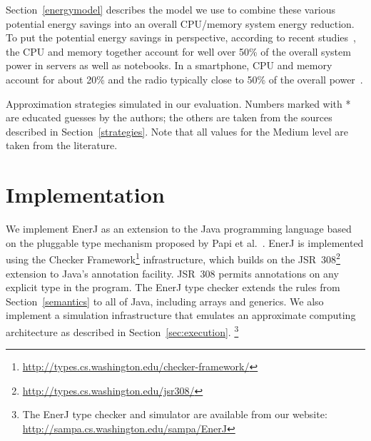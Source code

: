 \medskip
\noindent
Section~\ref{energymodel} describes the model we use to combine these
various potential energy savings into an overall CPU/memory system energy
reduction.
To put the potential energy savings in perspective, according to
recent studies~\cite{googlepower, aqeel}, the CPU and memory together account
for well over 50\% of the overall system power in servers as well as
notebooks. In a smartphone, CPU and memory account for about 20\% and
the radio typically close to 50\% of the overall
power~\cite{carroll2010}.






\begin{table}
\small
\begin{centering}

\end{centering}
\caption{Approximation strategies simulated in our evaluation.
Numbers marked with * are educated guesses by the authors; the others
are taken from the sources described in Section~\ref{strategies}. Note that
all values for the Medium level are taken from the literature.}
\label{table:approximations}
\end{table}




\section{Implementation}
\label{sec:impl}

We implement EnerJ as an extension to the Java
programming language based on the
pluggable type mechanism proposed by Papi et al.~\cite{pap2008}.
EnerJ is implemented using the
Checker Framework\footnote{\url{http://types.cs.washington.edu/checker-framework/}}
infrastructure,
which builds on the
JSR~308\footnote{\url{http://types.cs.washington.edu/jsr308/}}
extension to Java's annotation facility. JSR~308 permits annotations on
any explicit type in the program.
The EnerJ type checker extends the rules from Section~\ref{semantics} to all of
Java, including arrays and generics.
We also implement a simulation infrastructure that emulates an
approximate computing architecture as described in Section~\ref{sec:execution}.
\footnote{The EnerJ type checker and simulator
are available from
our website:
\url{http://sampa.cs.washington.edu/sampa/EnerJ}
}

